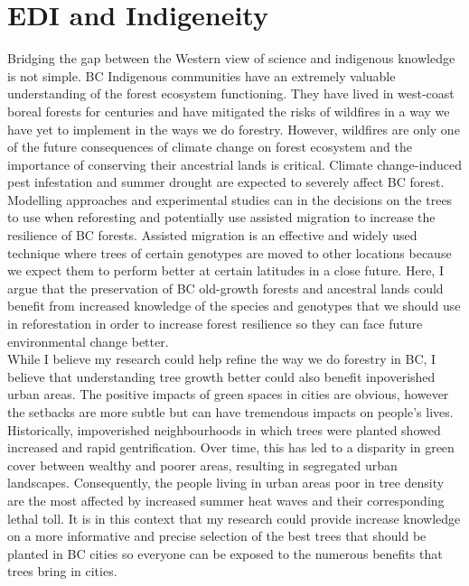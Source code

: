 \documentclass[11pt,letter]{article}
\begin{document}
\section *{EDI and Indigeneity}
Bridging the gap between the Western view of science and indigenous knowledge is not simple. BC Indigenous communities have an extremely valuable understanding of the forest ecosystem functioning. They have lived in west-coast boreal forests for centuries and have mitigated the risks of wildfires in a way we have yet to implement in the ways we do forestry. However, wildfires are only one of the future consequences of climate change on forest ecosystem and the importance of conserving their ancestrial lands is critical. Climate change-induced pest infestation and summer drought are expected to severely affect BC forest. Modelling approaches and experimental studies can in the decisions on the trees to use when reforesting and potentially use assisted migration to increase the resilience of BC forests. Assisted migration is an effective and widely used technique where trees of certain genotypes are moved to other locations because we expect them to perform better at certain latitudes in a close future. Here, I argue that the preservation of BC old-growth forests and ancestral lands could benefit from increased knowledge of the species and genotypes that we should use in reforestation in order to increase forest resilience so they can face future environmental change better.\\
While I believe my research could help refine the way we do forestry in BC, I believe that understanding tree growth better could also benefit inpoverished urban areas. The positive impacts of green spaces in cities are obvious, however the setbacks are more subtle but can have tremendous impacts on people's lives. Historically, impoverished neighbourhoods in which trees were planted showed increased and rapid gentrification. Over time, this has led to a disparity in green cover between wealthy and poorer areas, resulting in segregated urban landscapes. Consequently, the people living in urban areas poor in tree density are the most affected by increased summer heat waves and their corresponding lethal toll. It is in this context that my research could provide increase knowledge on a more informative and precise selection of the best trees that should be planted in BC cities so everyone can be exposed to the numerous benefits that trees bring in cities. 
\end{document}
